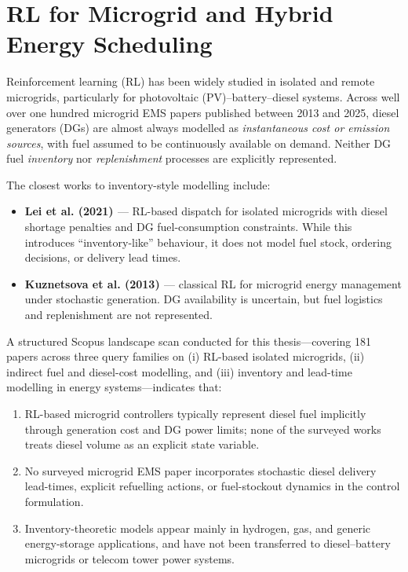 \section{RL for Microgrid and Hybrid Energy Scheduling}

Reinforcement learning (RL) has been widely studied in isolated and remote microgrids, particularly for photovoltaic (PV)–battery–diesel systems. Across well over one hundred microgrid EMS papers published between 2013 and 2025, diesel generators (DGs) are almost always modelled as \emph{instantaneous cost or emission sources}, with fuel assumed to be continuously available on demand. Neither DG fuel \emph{inventory} nor \emph{replenishment} processes are explicitly represented.

The closest works to inventory-style modelling include:
\begin{itemize}
    \item \textbf{Lei et al. (2021) \citep{lei_2021_drl_microgrid_dispatch}} — RL-based dispatch for isolated microgrids with diesel shortage penalties and DG fuel-consumption constraints. While this introduces ``inventory-like'' behaviour, it does not model fuel stock, ordering decisions, or delivery lead times.
    \item \textbf{Kuznetsova et al. (2013) \citep{kuznetsova_2013_microgrid_rl}} — classical RL for microgrid energy management under stochastic generation. DG availability is uncertain, but fuel logistics and replenishment are not represented.
\end{itemize}

A structured Scopus landscape scan conducted for this thesis—covering 181
papers across three query families on (i) RL-based isolated microgrids,
(ii) indirect fuel and diesel-cost modelling, and (iii) inventory and
lead-time modelling in energy systems—indicates that:
\begin{enumerate}
    \item RL-based microgrid controllers typically represent diesel fuel
    implicitly through generation cost and DG power limits; none of the
    surveyed works treats diesel volume as an explicit state variable.
    \item No surveyed microgrid EMS paper incorporates stochastic diesel
    delivery lead-times, explicit refuelling actions, or fuel-stockout
    dynamics in the control formulation.
    \item Inventory-theoretic models appear mainly in hydrogen, gas, and
    generic energy-storage applications, and have not been transferred to
    diesel–battery microgrids or telecom tower power systems.
\end{enumerate}

